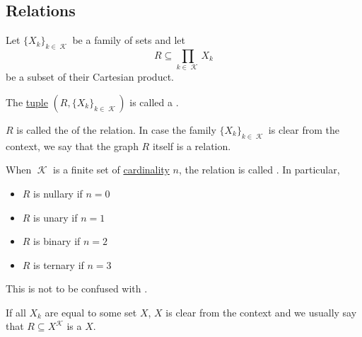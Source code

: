 \subsection{Relations}\label{subsec:relations}

\begin{definition}\label{def:relation}
  Let \( \{ X_k \}_{k \in \mscrK} \) be a family of sets and let
  \begin{equation*}
    R \subseteq \prod_{k \in \mscrK} X_k
  \end{equation*}
  be a subset of their Cartesian product.

  The \hyperref[def:cartesian_product]{tuple} \( (R,  \{ X_k \}_{k \in \mscrK}) \) is called a .

  \begin{thmenum}
     \( R \) is called the  of the relation. In case the family \( \{ X_k \}_{k \in \mscrK} \) is clear from the context, we say that the graph \( R \) itself is a relation.

     When \( \mscrK \) is a finite set of \hyperref[rem:cardinals]{cardinality} \( n \), the relation is called . In particular,
    \begin{itemize}
      \item \( R \) is nullary if \( n = 0 \)
      \item \( R \) is unary if \( n = 1 \)
      \item \( R \) is binary if \( n = 2 \)
      \item \( R \) is ternary if \( n = 3 \)
    \end{itemize}

    This is not to be confused with .

     If all \( X_k \) are equal to some set \( X \), \( X \) is clear from the context and we usually say that \( R \subseteq X^{\mscrK} \) is a  \( X \).
  \end{thmenum}
\end{definition}

